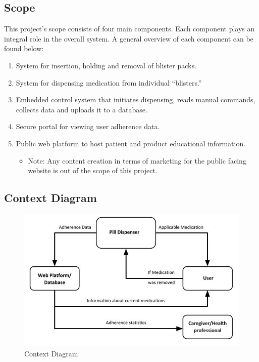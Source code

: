 \documentclass[12pt,titlepage]{article}
\begin{document}
\subsection{Scope}
This project's scope consists of four main components. Each component plays an integral role in the overall system. A general overview of each component can be found below:
\begin{enumerate}
\item System for insertion, holding and removal of blister packs.
    \item System for dispensing medication from individual ``blisters.''
    \item Embedded control system that initiates dispensing, reads manual commands, collects data and uploads it to a database.
    \item Secure portal for viewing user adherence data.
    \item Public web platform to host patient and product educational information.
    \begin{itemize}
        \item Note: Any content creation in terms of marketing for the public facing website is out of the scope of this project. 
    \end{itemize}
\end{enumerate}

\pagebreak
\subsection{Context Diagram}
 \begin{figure}[h]
  \centering
  \includegraphics[width=.8\linewidth]{ContextDiagram.jpg}
  \caption{Context Diagram}
\end{figure}
\end{document}
